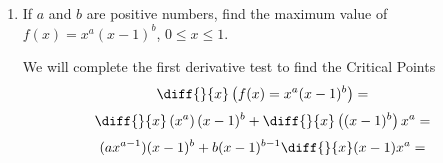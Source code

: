 \documentclass{article}
\begin{document}
\begin{enumerate}[label=\textbf{(13.\arabic*)}]
    \item If $a$ and $b$ are positive numbers, find the maximum value of $f(x)=x^a(x-1)^b$, $0\le x\le 1$.
    
    We will complete the first derivative test to find the Critical Points
    \[\diff{}{x}\left(f(x)=x^a(x-1)^b\right)=\]
\[\diff{}{x}\left(x^a\right)(x-1)^b+\diff{}{x}\left((x-1)^b\right)x^a=\]
\[(ax^{a-1})(x-1)^b+b(x-1)^{b-1}\diff{}{x}(x-1)x^a=\]
\end{enumerate}
\end{document}
